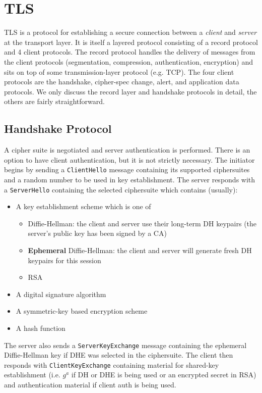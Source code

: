 \documentclass[11pt]{report}
\begin{document}
\section{TLS}

TLS is a protocol for establishing a secure connection between a \textit{client} and \textit{server} at the transport layer. It is itself a layered protocol consisting of a record protocol and 4 client protocols. The record protocol handles the delivery of messages from the client protocols (segmentation, compression, authentication, encryption) and sits on top of some transmission-layer protocol (e.g. TCP). The four client protocols are the handshake, cipher-spec change, alert, and application data protocols. We only discuss the record layer and handshake protocols in detail, the others are fairly straightforward.

\subsection{Handshake Protocol}
A cipher suite is negotiated and server authentication is performed. There is an option to have client authentication, but it is not strictly necessary. The initiator begins by sending a \texttt{ClientHello} message containing its supported ciphersuites and a random number to be used in key establishment. The server responds with a \texttt{ServerHello} containing the selected ciphersuite which contains (usually):

\begin{itemize}
	\item A key establishment scheme which is one of
	\begin{itemize}
		\item Diffie-Hellman: the client and server use their long-term DH keypairs (the server's public key has been signed by a CA)
		\item \textbf{Ephemeral} Diffie-Hellman: the client and server will generate fresh DH keypairs for this session
		\item RSA
	\end{itemize}
	\item A digital signature algorithm
	\item A symmetric-key based encryption scheme
	\item A hash function
\end{itemize}

The server also sends a \texttt{ServerKeyExchange} message containing the ephemeral Diffie-Hellman key if DHE was selected in the ciphersuite. The client then responds with \texttt{ClientKeyExchange} containing material for shared-key establishment (i.e. $g^a$ if DH or DHE is being used or an encrypted secret in RSA) and authentication material if client auth is being used.
\end{document}
